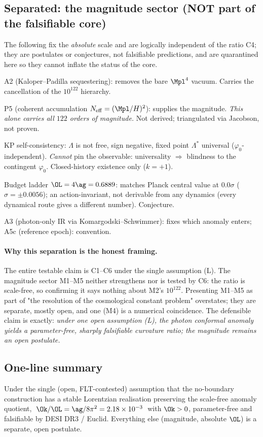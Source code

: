 \subsection*{Separated: the magnitude sector (NOT part of the falsifiable core)}

The following fix the \emph{absolute} scale and are logically independent of
the ratio C4; they are postulates or conjectures, not falsifiable predictions,
and are quarantined here so they cannot inflate the status of the core.

\begin{description}[leftmargin=2.8em,itemsep=3pt]
\item[M1 {[POST]}] A2 (Kaloper--Padilla sequestering): removes the bare
  $\Mpl^4$ vacuum. Carries the cancellation of the $10^{122}$ hierarchy.
\item[M2 {[POST]}] P5 (coherent accumulation $N_{\mathrm{eff}}=(\Mpl/H)^2$):
  supplies the magnitude. \emph{This alone carries all $122$ orders of
  magnitude.} Not derived; triangulated via Jacobson, not proven.
\item[M3 {[DER\,$|$\,A2; numeric]}] KP self-consistency: $\Lambda$ is not free,
  sign negative, fixed point $\Lambda^*$ universal ($\varphi_0$-independent).
  \emph{Cannot} pin the observable: universality $\Rightarrow$ blindness to the
  contingent $\varphi_0$. Closed-history existence only ($k=+1$).
\item[M4 {[CONJ]}] Budget ladder $\OL=4\ag=0.6889$: matches Planck central
  value at $0.0\sigma$ ($\sigma=\pm0.0056$); an action-invariant, not derivable
  from any dynamics (every dynamical route gives a different number).
  Conjecture.
\item[M5 {[POST]}] A3 (photon-only IR via Komargodski--Schwimmer): fixes which
  anomaly enters; A5c (reference epoch): convention.
\end{description}

\paragraph{Why this separation is the honest framing.}
The entire testable claim is C1--C6 under the single assumption (L). The
magnitude sector M1--M5 neither strengthens nor is tested by C6: the ratio is
scale-free, so confirming it says nothing about M2's $10^{122}$. Presenting
M1--M5 as part of "the resolution of the cosmological constant problem"
overstates; they are separate, mostly open, and one (M4) is a numerical
coincidence. The defensible claim is exactly: \emph{under one open assumption
(L), the photon conformal anomaly yields a parameter-free, sharply falsifiable
curvature ratio; the magnitude remains an open postulate.}

\subsection*{One-line summary}
Under the single (open, FLT-contested) assumption that the no-boundary
construction has a stable Lorentzian realisation preserving the scale-free
anomaly quotient, $\;\Ok/\OL=\ag/8\pi^2=2.18\times10^{-3}\;$ with $\Ok>0$,
parameter-free and falsifiable by DESI DR3 / Euclid. Everything else
(magnitude, absolute $\OL$) is a separate, open postulate.
